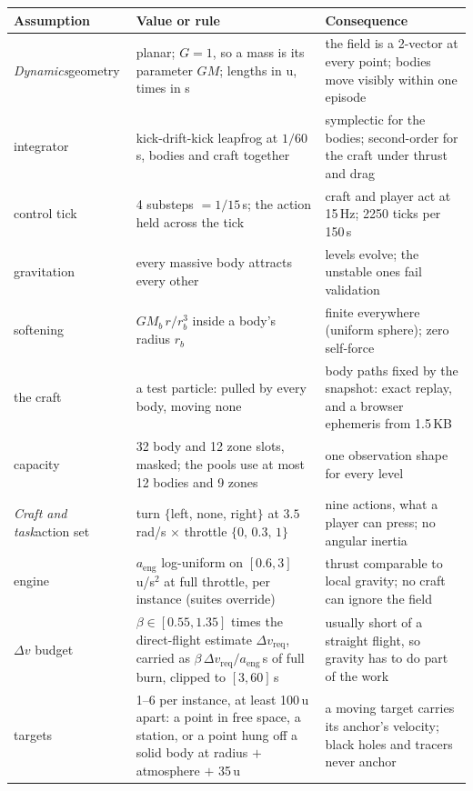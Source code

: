 \begin{table}[p]
\centering
\scriptsize
\setlength{\tabcolsep}{4pt}
\begin{tabular}{p{2.0cm}p{6.4cm}p{7.0cm}}
\toprule
Assumption & Value or rule & Consequence \\
\midrule
\emph{Dynamics}\newline geometry & planar; $G = 1$, so a mass is its parameter $GM$; lengths in u, times in s & the field is a 2-vector at every point; bodies move visibly within one episode \\
integrator & kick-drift-kick leapfrog at $1/60$\,s, bodies and craft together & symplectic for the bodies; second-order for the craft under thrust and drag \\
control tick & 4 substeps $= 1/15$\,s; the action held across the tick & craft and player act at 15\,Hz; 2250 ticks per 150\,s \\
gravitation & every massive body attracts every other & levels evolve; the unstable ones fail validation \\
softening & $GM_b\,r/r_b^3$ inside a body's radius $r_b$ & finite everywhere (uniform sphere); zero self-force \\
the craft & a test particle: pulled by every body, moving none & body paths fixed by the snapshot: exact replay, and a browser ephemeris from 1.5\,KB \\
capacity & 32 body and 12 zone slots, masked; the pools use at most 12 bodies and 9 zones & one observation shape for every level \\
\midrule
\emph{Craft and task}\newline action set & turn $\{$left, none, right$\}$ at $3.5$\,rad/s $\times$ throttle $\{0,\,0.3,\,1\}$ & nine actions, what a player can press; no angular inertia \\
engine & $a_{\mathrm{eng}}$ log-uniform on $[0.6, 3]$\,u/s$^2$ at full throttle, per instance (suites override) & thrust comparable to local gravity; no craft can ignore the field \\
$\Delta v$ budget & $\beta \in [0.55, 1.35]$ times the direct-flight estimate $\Delta v_{\mathrm{req}}$, carried as $\beta\,\Delta v_{\mathrm{req}}/a_{\mathrm{eng}}$\,s of full burn, clipped to $[3, 60]$\,s & usually short of a straight flight, so gravity has to do part of the work \\
targets & 1--6 per instance, at least 100\,u apart: a point in free space, a station, or a point hung off a solid body at radius $+$ atmosphere $+$ 35\,u & a moving target carries its anchor's velocity; black holes and tracers never anchor \\

\end{tabular}
\end{table}
